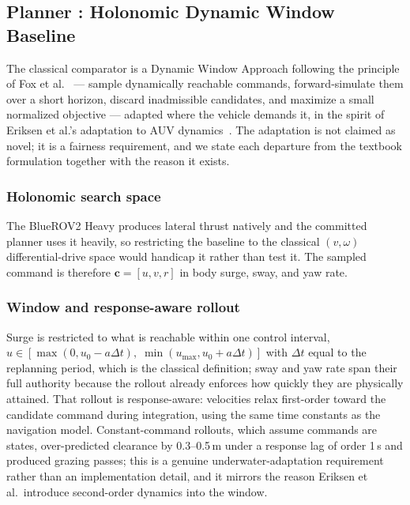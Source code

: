 \subsection{Planner \PD{}: Holonomic Dynamic Window Baseline}

The classical comparator is a Dynamic Window Approach following the
principle of Fox et al.~\cite{fox1997thedynam} --- sample dynamically
reachable commands, forward-simulate them over a short horizon, discard
inadmissible candidates, and maximize a small normalized objective ---
adapted where the vehicle demands it, in the spirit of Eriksen et al.'s
adaptation to AUV dynamics~\cite{eriksen2016amodifie}. The adaptation is not
claimed as novel; it is a fairness requirement, and we state each departure
from the textbook formulation together with the reason it exists.

\subsubsection{Holonomic search space}
The BlueROV2 Heavy produces lateral thrust natively and the committed planner
uses it heavily, so restricting the baseline to the classical
$(v,\omega)$ differential-drive space would handicap it rather than test it.
The sampled command is therefore $\mathbf{c} = [u, v, r]$ in body surge, sway,
and yaw rate.

\subsubsection{Window and response-aware rollout}
Surge is restricted to what is reachable within one control interval,
$u \in [\max(0, u_0 - a\Delta t),\; \min(u_{\max}, u_0 + a\Delta t)]$ with
$\Delta t$ equal to the replanning period, which is the classical definition;
sway and yaw rate span their full authority because the rollout already
enforces how quickly they are physically attained. That rollout is
response-aware: velocities relax first-order toward the candidate command
during integration, using the same time constants as the navigation model.
Constant-command rollouts, which assume commands are states, over-predicted
clearance by 0.3--0.5\,m under a response lag of order 1\,s and produced
grazing passes; this is a genuine underwater-adaptation requirement rather
than an implementation detail, and it mirrors the reason Eriksen et al.\
introduce second-order dynamics into the window.

